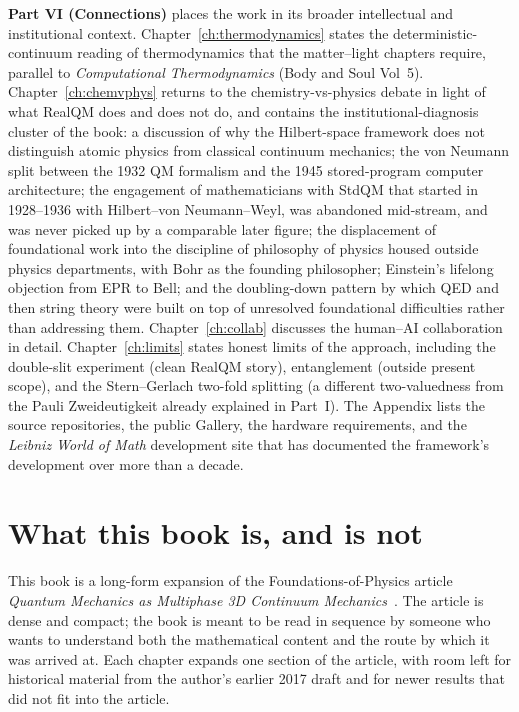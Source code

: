\textbf{Part VI (Connections)} places the work in its broader intellectual and institutional context. Chapter~\ref{ch:thermodynamics} states the deterministic-continuum reading of thermodynamics that the matter--light chapters require, parallel to \emph{Computational Thermodynamics} (Body and Soul Vol~5). Chapter~\ref{ch:chemvphys} returns to the chemistry-vs-physics debate in light of what RealQM does and does not do, and contains the institutional-diagnosis cluster of the book: a discussion of why the Hilbert-space framework does not distinguish atomic physics from classical continuum mechanics; the von Neumann split between the 1932 QM formalism and the 1945 stored-program computer architecture; the engagement of mathematicians with StdQM that started in 1928--1936 with Hilbert--von Neumann--Weyl, was abandoned mid-stream, and was never picked up by a comparable later figure; the displacement of foundational work into the discipline of philosophy of physics housed outside physics departments, with Bohr as the founding philosopher; Einstein's lifelong objection from EPR to Bell; and the doubling-down pattern by which QED and then string theory were built on top of unresolved foundational difficulties rather than addressing them. Chapter~\ref{ch:collab} discusses the human--AI collaboration in detail. Chapter~\ref{ch:limits} states honest limits of the approach, including the double-slit experiment (clean RealQM story), entanglement (outside present scope), and the Stern--Gerlach two-fold splitting (a different two-valuedness from the Pauli Zweideutigkeit already explained in Part~I). The Appendix lists the source repositories, the public Gallery, the hardware requirements, and the \emph{Leibniz World of Math} development site that has documented the framework's development over more than a decade.

\section{What this book is, and is not}

This book is a long-form expansion of the Foundations-of-Physics article \emph{Quantum Mechanics as Multiphase 3D Continuum Mechanics}~\cite{Johnson2026FoP}. The article is dense and compact; the book is meant to be read in sequence by someone who wants to understand both the mathematical content and the route by which it was arrived at. Each chapter expands one section of the article, with room left for historical material from the author's earlier 2017 draft and for newer results that did not fit into the article.

